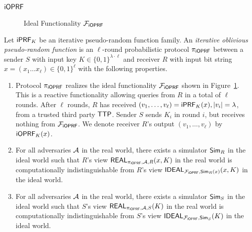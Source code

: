 \subsection{$\mathsf{i}\mathsf{OPRF}$}
\begin{figure}[tb]
\LinesNumbered
\begingroup
\removelatexerror%
\begin{spacing}{0.7}
\begin{functionality}[H]\small
\end{functionality}
\end{spacing}
\endgroup
\caption{Ideal Functionality $\mathcal{F}_{\mathsf{i}\mathsf{OPRF}}$\label{idealioprf}}
\end{figure}

\begin{definition}[$\proto$]
  \label{def:ioprf}
  Let $\mathsf{i}\mathsf{PRF}_K$ be an iterative pseudo-random function family.  An
  \emph{iterative {oblivious} pseudo-random function} is an $\ell$-round
  probabilistic protocol $\proto$ between a sender $S$ with input key
  $K\in\{0,1\}^{\lambda\cdot\ell}$ and receiver $R$ with input bit
  string $x=(x_1\ldots{}x_\ell)\in\{0,1\}^{\ell}$ with the following
  properties.

  
\begin{enumerate}[leftmargin=*]
  \item Protocol $\proto$ realizes the ideal functionality $\mathcal{F}_{\mathsf{i}\mathsf{OPRF}}$
    shown in Figure~\ref{idealioprf}. This is a reactive
    functionality allowing queries from $R$ in a total of $\ell$
    rounds.  After $\ell$ rounds, $R$ has received
    $(v_1,\ldots,v_\ell)=\mathsf{i}\mathsf{PRF}_K(x),|v_i|=\lambda$, from a trusted
    third party $\mathsf{TTP}$.  Sender $S$ sends $K_i$ in round $i$, but
    receives nothing from $\mathcal{F}_{\mathsf{i}\mathsf{OPRF}}$. We denote receiver $R$'s output $(v_1,\ldots,v_\ell)$ by $\mathsf{i}\mathsf{OPRF}_K(x)$.
  
  \item For all adversaries ${\mathcal{A}}$ in the real world, there exists a
    simulator ${\mathsf{Sim}}_R$ in the ideal world such that $R$'s view
    $\mathsf{REAL}_{{\pi_{\mathsf{i}\mathsf{OPRF}}},{\mathcal{A}},R}(x,K)$ in the real world is
    computationally indistinguishable from $R$'s view
    $\mathsf{IDEAL}_{\mathcal{F}_{\mathsf{i}\mathsf{OPRF}},{\mathsf{Sim}}_R(x)}(x,K)$ in the ideal world.

  \item For all adversaries ${\mathcal{A}}$ in the real world, there exists a
    simulator ${\mathsf{Sim}}_S$ in the ideal world such that $S$'s view
    $\mathsf{REAL}_{{\pi_{\mathsf{i}\mathsf{OPRF}}},{\mathcal{A}},S}(K)$ in the real world is
    computationally indistinguishable from $S$'s view
    $\mathsf{IDEAL}_{\mathcal{F}_{\mathsf{i}\mathsf{OPRF}},{\mathsf{Sim}}_S}(K)$ in the ideal world.
\end{enumerate}
\end{definition}

